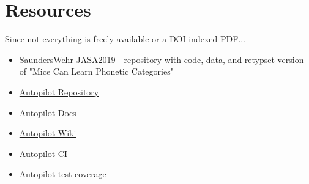 





\section{Resources}

Since not everything is freely available or a DOI-indexed PDF...

\begin{itemize}
\item \href{https://github.com/wehr-lab/SaundersWehr-JASA2019}{SaundersWehr-JASA2019} - repository with code, data, and retypset version of "Mice Can Learn Phonetic Categories"
\item \href{https://github.com/wehr-lab/autopilot}{Autopilot Repository}
\item \href{https://docs.auto-pi-lot.com}{Autopilot Docs}
\item \href{https://wiki.auto-pi-lot.com}{Autopilot Wiki}
\item \href{https://app.travis-ci.com/github/wehr-lab/autopilot/branches}{Autopilot CI}
\item \href{https://coveralls.io/github/wehr-lab/autopilot}{Autopilot test coverage}
\end{itemize}

